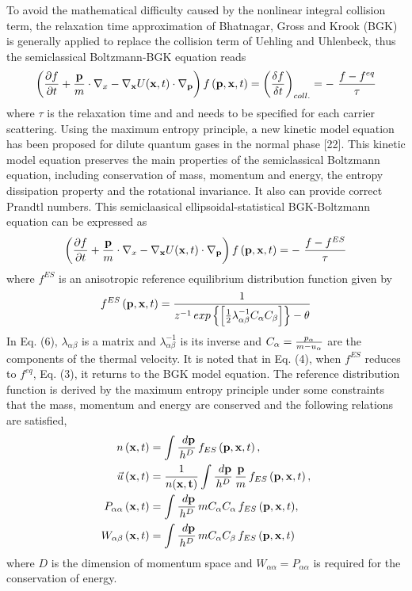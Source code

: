 \documentclass{rsproca}%
\begin{document}
To avoid the mathematical difficulty caused by the nonlinear integral collision term, the relaxation time approximation of Bhatnagar, Gross and Krook (BGK) is generally applied to replace the collision term of Uehling and Uhlenbeck, thus the semiclassical Boltzmann-BGK equation reads
\begin{equation}
\left(\frac{\partial f}{\partial t}+\frac{\bf p}{m}\cdot {\bf\nabla }_x-{\bf \nabla}_{\bf x} U({\bf x},t)\cdot {\bf\nabla }_{\bf p}\right)f\left({\bf p},{\bf x},t\right) =\left(\frac{\delta f}{\delta t}\right)_{coll.}= -\ \frac{f-f^{eq}}{\tau }
\end{equation}
where $\tau$ is the relaxation time and and needs to be specified for each carrier scattering.
Using the maximum entropy principle, a new kinetic model equation has been proposed for dilute quantum gases in the normal phase [22].  This kinetic model equation preserves the main properties of the semiclassical Boltzmann equation, including conservation of mass, momentum and energy, the entropy dissipation property and the rotational invariance.   It also can provide correct Prandtl numbers.   This semiclaasical ellipsoidal-statistical BGK-Boltzmann equation can be expressed as
\begin{equation}
\left(\frac{\partial f}{\partial t}+\frac{\bf p}{m}\cdot {\bf\nabla }_x-{\bf \nabla}_{\bf x} U({\bf x},t)\cdot {\bf\nabla }_{\bf p}\right)f\left({\bf p},{\bf x},t\right) = -\ \frac{f-f^{ES}}{\tau }
\end{equation}
where $f^{ES}$ is an anisotropic reference equilibrium distribution function given by
\begin{equation}
f^{ES}\left({\bf p},{\bf x},t\right) =\frac{1}{z^{-1}\,exp\left\{{\left[ {1\over 2} \lambda_{\alpha \beta}^{-1} C_{\alpha} C_{\beta} \right]} \right\} -\theta } 
\end{equation}
In Eq. (6), $\lambda_{\alpha \beta}$ is a matrix and $\lambda_{\alpha \beta}^{-1}$ is its inverse and $C_{\alpha} = {p_{\alpha} \over m - u_{\alpha}}$ are the components of the thermal velocity.
It is noted that in Eq. (4), when $f^{ES}$ reduces to $f^{eq}$, Eq. (3), it returns to the BGK model equation.
The reference distribution function is derived by the maximum entropy principle under some constraints that the mass, momentum and energy are conserved and the following relations are satisfied,
\begin{align}
n\left({\bf x},t\right) &= \int{\frac{\ d{\bf p}}{h^D}}\,f_{ES} \left({\bf p},{\bf x}, t\right), \\
\vec u \left({\bf x},t\right) &= \frac{1}{n(\bf x, t)}\int{\frac{\ d{\bf p}}{h^D}\,\frac{\bf p}{m}}\,f_{ES}\left({\bf p},{\bf x}, t\right), \\
P_{\alpha \alpha} \left({\bf x},t\right) &= \int{\frac{\ d{\bf p}}{h^D}\, m C_{\alpha} C_{\alpha} \,f_{ES}\left({\bf p},{\bf x}, t\right)}, \\
W_{\alpha \beta} \left({\bf x},t\right) &= \int{\frac{\ d{\bf p}}{h^D}\,m C_{\alpha} C_{\beta} \,f_{ES} \left({\bf p},{\bf x}, t\right)} 
\end{align}
where $D$ is the dimension of momentum space and $W_{\alpha \alpha} = P_{\alpha \alpha}$ is required for the conservation of energy.
\end{document}
